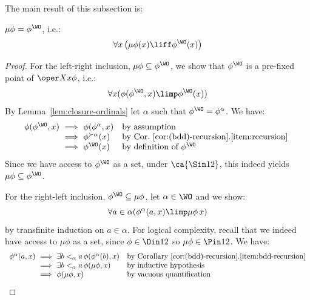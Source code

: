 

The main result of this subsection is:
\begin{theorem}
\label{thm:muphi-is-phiwo}
$\mu \phi =  \phi^\WO$, i.e.:
\[
\forall x \left(
\mu \phi (x) \liff \phi^\WO(x)
\right)
\]
\end{theorem}
\begin{proof}
For the left-right inclusion, $\mu \phi \subseteq  \phi^\WO$, we show that $\phi^\WO$ is a pre-fixed point of $\oper X x \phi$, i.e.:
\[
\forall x (\phi (\phi^\WO,x) \limp \phi^\WO (x))
\]
By Lemma~\ref{lem:closure-ordinals} let $\alpha $ such that $\phi^\WO = \phi^\alpha$.
We have:
\[
\begin{array}{r@{\ \implies \ }ll}
     \phi(\phi^\WO,x) & \phi(\phi^\alpha,x) & \text{by assumption} \\
     & \phi^{\succ \alpha}(x) & \text{by Cor.~\ref{cor:(bdd)-recursion}.\ref{item:recursion} } \\
     & \phi^\WO (x) & \text{by definition of $\phi^\WO$}
\end{array}
\]
Since we have access to $\phi^\WO$ as a set, under $\ca{\Sin 1 2}$, this indeed yields $\mu \phi \subseteq \phi^\WO$.

For the right-left inclusion, $\phi^\WO \subseteq \mu \phi$, let $\alpha \in \WO$ and we show:
\[
\forall a \in \alpha ( \phi^\alpha(a,x) \limp \mu \phi\, x)
\]
by transfinite induction on $a \in \alpha$.
For logical complexity, recall that we indeed have access to $\mu\phi$ as a set, since $\phi\in \Din 1 2$ so $\mu\phi \in \Pin 1 2$.
We have:
\[
\begin{array}[b]{r@{\ \implies \ }ll}
     \phi^\alpha(a,x) & \exists b<_\alpha a \, \phi(\phi^\alpha(b),x) & \text{by Corollary~\ref{cor:(bdd)-recursion}.\ref{item:bdd-recursion}}\\
     & \exists b<_\alpha a \, \phi(\mu\phi,x) & \text{by inductive hypothesis} \\
     & \phi(\mu\phi,x) & \text{by vacuous quantification} \tag*{\qed}
\end{array}
\]
\renewcommand{\qed}{}
\end{proof}




